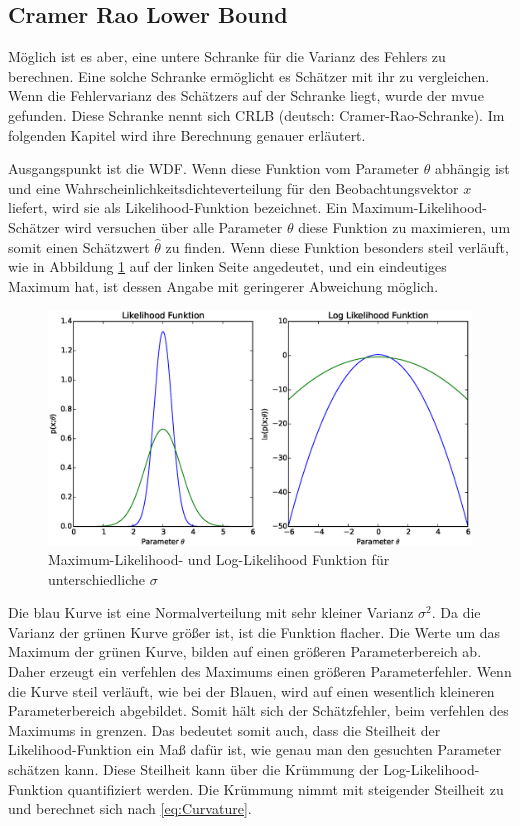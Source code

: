 \subsection{Cramer Rao Lower Bound}
\label{chap2.3.1:CRLB}
Möglich ist es aber, eine untere Schranke für die Varianz des Fehlers zu berechnen. Eine solche Schranke ermöglicht es Schätzer mit ihr zu vergleichen. Wenn die Fehlervarianz des Schätzers auf der Schranke liegt, wurde der \gls{mvue} gefunden. Diese Schranke nennt sich \gls{CRLB} (deutsch: Cramer-Rao-Schranke). Im folgenden Kapitel wird ihre Berechnung genauer erläutert.

Ausgangspunkt ist die \gls{WDF}. Wenn diese Funktion vom Parameter $\theta$ abhängig ist und eine Wahrscheinlichkeitsdichteverteilung für den Beobachtungsvektor $x$ liefert, wird sie als Likelihood-Funktion bezeichnet. Ein Maximum-Likelihood-Schätzer wird versuchen über alle Parameter $\theta$ diese Funktion zu maximieren, um somit einen Schätzwert $\hat{\theta}$ zu finden. Wenn diese Funktion besonders steil verläuft, wie in Abbildung \ref{fig:ML_Herleitung} auf der linken Seite angedeutet, und ein eindeutiges Maximum hat, ist dessen Angabe mit geringerer Abweichung möglich. 

\begin{figure}[htbp]
	\centering
	\includegraphics[width = \textwidth]{images/ML_Herleitung}
	\caption{Maximum-Likelihood- und Log-Likelihood Funktion für unterschiedliche $\sigma$}
	\label{fig:ML_Herleitung}
\end{figure}

Die blau Kurve ist eine Normalverteilung mit sehr kleiner Varianz $\sigma^2$. Da die Varianz der grünen Kurve größer ist, ist die Funktion flacher. Die Werte um das Maximum der grünen Kurve, bilden auf einen größeren Parameterbereich ab. Daher erzeugt ein verfehlen des Maximums einen größeren Parameterfehler. Wenn die Kurve steil verläuft, wie bei der Blauen, wird auf einen wesentlich kleineren Parameterbereich abgebildet. Somit hält sich der Schätzfehler, beim verfehlen des Maximums in grenzen. Das bedeutet somit auch, dass die Steilheit der Likelihood-Funktion ein Maß dafür ist, wie genau man den gesuchten Parameter schätzen kann. Diese Steilheit kann über die Krümmung der Log-Likelihood-Funktion quantifiziert werden\cite[S.29]{kay1993fundamentals}. Die Krümmung nimmt mit steigender Steilheit zu und berechnet sich nach \eqref{eq:Curvature}. 

